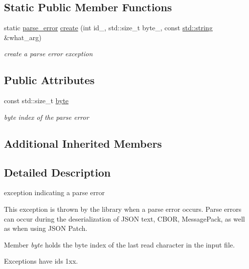 \subsection*{Static Public Member Functions}
\begin{DoxyCompactItemize}
\item 
static \hyperlink{classnlohmann_1_1detail_1_1parse__error}{parse\+\_\+error} \hyperlink{classnlohmann_1_1detail_1_1parse__error_a9fd60ad6bce80fd99686ad332faefd37}{create} (int id\+\_\+, std\+::size\+\_\+t byte\+\_\+, const \hyperlink{namespacenlohmann_1_1detail_a1ed8fc6239da25abcaf681d30ace4985ab45cffe084dd3d20d928bee85e7b0f21}{std\+::string} \&what\+\_\+arg)
\begin{DoxyCompactList}\small\item\em create a parse error exception \end{DoxyCompactList}\end{DoxyCompactItemize}
\subsection*{Public Attributes}
\begin{DoxyCompactItemize}
\item 
const std\+::size\+\_\+t \hyperlink{classnlohmann_1_1detail_1_1parse__error_a9505aaa1ca943be927eec7cc579592ff}{byte}
\begin{DoxyCompactList}\small\item\em byte index of the parse error \end{DoxyCompactList}\end{DoxyCompactItemize}
\subsection*{Additional Inherited Members}


\subsection{Detailed Description}
exception indicating a parse error 

This exception is thrown by the library when a parse error occurs. Parse errors can occur during the deserialization of J\+S\+ON text, C\+B\+OR, Message\+Pack, as well as when using J\+S\+ON Patch.

Member {\itshape byte} holds the byte index of the last read character in the input file.

Exceptions have ids 1xx.

